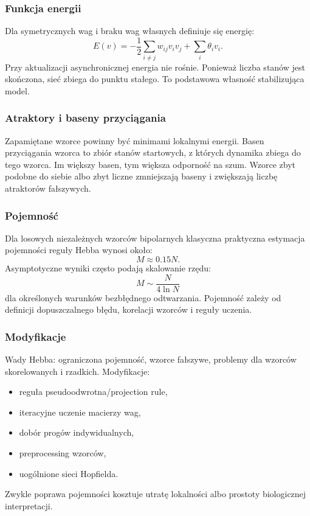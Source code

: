 \subsubsection{Funkcja energii}

Dla symetrycznych wag i braku wag własnych definiuje się energię:
\[
E(v)=-\frac{1}{2}\sum_{i\ne j}w_{ij}v_iv_j+\sum_i\theta_i v_i.
\]
Przy aktualizacji asynchronicznej energia nie rośnie. Ponieważ liczba stanów jest skończona, sieć zbiega do punktu stałego. To podstawowa własność stabilizująca model.

\subsubsection{Atraktory i baseny przyciągania}

Zapamiętane wzorce powinny być minimami lokalnymi energii. Basen przyciągania wzorca to zbiór stanów startowych, z których dynamika zbiega do tego wzorca. Im większy basen, tym większa odporność na szum. Wzorce zbyt podobne do siebie albo zbyt liczne zmniejszają baseny i zwiększają liczbę atraktorów fałszywych.

\subsubsection{Pojemność}

Dla losowych niezależnych wzorców bipolarnych klasyczna praktyczna estymacja pojemności reguły Hebba wynosi około:
\[
M\approx 0.15N.
\]
Asymptotyczne wyniki często podają skalowanie rzędu:
\[
M\sim \frac{N}{4\ln N}
\]
dla określonych warunków bezbłędnego odtwarzania. Pojemność zależy od definicji dopuszczalnego błędu, korelacji wzorców i reguły uczenia.

\subsubsection{Modyfikacje}

Wady Hebba: ograniczona pojemność, wzorce fałszywe, problemy dla wzorców skorelowanych i rzadkich. Modyfikacje:
\begin{itemize}
  \item reguła pseudoodwrotna/projection rule,
  \item iteracyjne uczenie macierzy wag,
  \item dobór progów indywidualnych,
  \item preprocessing wzorców,
  \item uogólnione sieci Hopfielda.
\end{itemize}
Zwykle poprawa pojemności kosztuje utratę lokalności albo prostoty biologicznej interpretacji.

